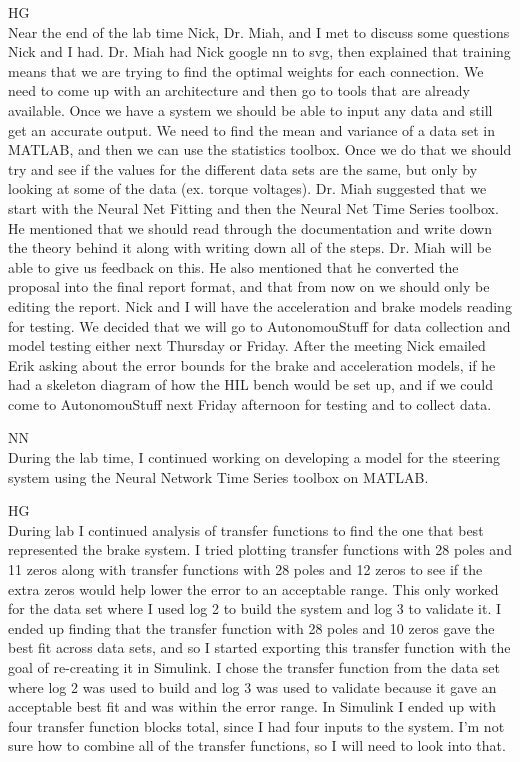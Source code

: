 \documentclass[fontsize=11pt, %
                             paper=letter, %
                             openany, %
                             captions=tableheading,
                             index=totoc,
                             hyperref]{labbook}
\def\currentYear{2021}
\begin{document}
\begin{addmargin}[0cm]{0cm}
HG\\
Near the end of the lab time Nick, Dr. Miah, and I met to discuss some questions Nick and I had. Dr. Miah had Nick google nn to svg, then explained that training means that we are trying to find the optimal weights for each connection. We need to come up with an architecture and then go to tools that are already available. Once we have a system we should be able to input any data and still get an accurate output. We need to find the mean and variance of a data set in MATLAB, and then we can use the statistics toolbox. Once we do that we should try and see if the values for the different data sets are the same, but only by looking at some of the data (ex. torque voltages). Dr. Miah suggested that we start with the Neural Net Fitting and then the Neural Net Time Series toolbox. He mentioned that we should read through the documentation and write down the theory behind it along with writing down all of the steps. Dr. Miah will be able to give us feedback on this. He also mentioned that he converted the proposal into the final report format, and that from now on we should only be editing the report. Nick and I will have the acceleration and brake models reading for testing. We decided that we will go to AutonomouStuff for data collection and model testing either next Thursday or Friday. After the meeting Nick emailed Erik asking about the error bounds for the brake and acceleration models, if he had a skeleton diagram of how the HIL bench would be set up, and if we could come to AutonomouStuff next Friday afternoon for testing and to collect data. 


\labday{Wednesday, February 16, \currentYear}
NN\\
During the lab time, I continued working on developing a model for the steering system using the Neural Network Time Series toolbox on MATLAB. 

HG\\
During lab I continued analysis of transfer functions to find the one that best represented the brake system. I tried plotting transfer functions with 28 poles and 11 zeros along with transfer functions with 28 poles and 12 zeros to see if the extra zeros would help lower the error to an acceptable range. This only worked for the data set where I used log 2 to build the system and log 3 to validate it. I ended up finding that the transfer function with 28 poles and 10 zeros gave the best fit across data sets, and so I started exporting this transfer function with the goal of re-creating it in Simulink. I chose the transfer function from the data set where log 2 was used to build and log 3 was used to validate because it gave an acceptable best fit and was within the error range. In Simulink I ended up with four transfer function blocks total, since I had four inputs to the system. I'm not sure how to combine all of the transfer functions, so I will need to look into that. 


\end{addmargin}
\end{document}
